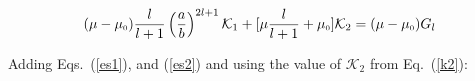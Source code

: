 
\begin{equation}\label{es2}
(\mu-\mu_{\scriptscriptstyle 0})\frac{l}{l+1}\left(\dfrac{a}{b}\right)^{2l+1}\mathcal{K}_1+[\mu\frac{l}{l+1}+\mu_{\scriptscriptstyle 0}]\mathcal{K}_2=(\mu-\mu_{\scriptscriptstyle 0})G_l
\end{equation}


Adding Eqs.~(\ref{es1}), and (\ref{es2}) and using the value of $\mathcal{K}_2$ from Eq.~(\ref{k2}):

